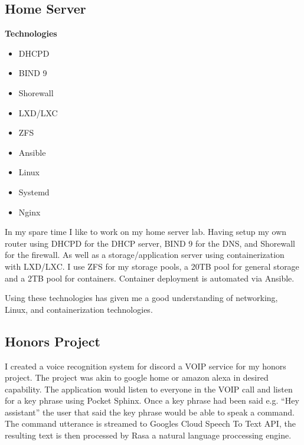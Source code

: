 \documentclass[a4paper]{cv}
\begin{document}
\begin{minipage}[t]{0.70\textwidth}
\subsection{Home Server}
\begin{multicols}{4}
{\bfseries Technologies}\vfill\null
\columnbreak
\begin{itemize} 
    \item DHCPD
    \item BIND 9
    \item Shorewall
    \item LXD/LXC
    \item ZFS
    \item Ansible
    \item Linux
    \item Systemd
    \item Nginx
\end{itemize}
\end{multicols}
In my spare time I like to work on my home server lab. Having setup my own router using DHCPD for the DHCP server, BIND 9 for the DNS, and Shorewall for the firewall. As well as a storage/application server using containerization with LXD/LXC. I use ZFS for my storage pools, a 20TB pool for general storage and a 2TB pool for containers. Container deployment is automated via Ansible.

Using these technologies has given me a good understanding of networking, Linux, and containerization technologies.

\sectionspace
\subsection{Honors Project}
I created a voice recognition system for discord a VOIP service for my honors project. The project was akin to google home or amazon alexa in desired capability. The application would listen to everyone in the VOIP call and listen for a key phrase using Pocket Sphinx. Once a key phrase had been said e.g. ``Hey assistant'' the user that said the key phrase would be able to speak a command. The command utterance is streamed to Googles Cloud Speech To Text API, the resulting text is then processed by Rasa a natural language proccessing engine.
\end{minipage}
\end{document}

